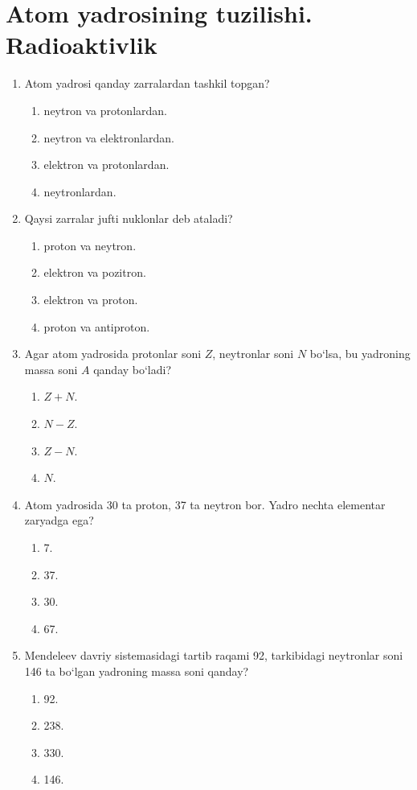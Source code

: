 \section{Atom yadrosining tuzilishi. Radioaktivlik}


\begin{enumerate}

\item Atom yadrosi qanday zarralardan tashkil topgan?
\begin{enumerate}[label=\Alph*)]
\item neytron va protonlardan.
\item neytron va elektronlardan.
\item elektron va protonlardan.
\item neytronlardan.
\end{enumerate}

\item Qaysi zarralar jufti nuklonlar deb ataladi?
\begin{enumerate}[label=\Alph*)]
\item proton va neytron.
\item elektron va pozitron.
\item elektron va proton.
\item proton va antiproton.
\end{enumerate}

\item Agar atom yadrosida protonlar soni $Z$, neytronlar soni $N$ bo‘lsa, bu yadroning massa soni $A$ qanday bo‘ladi?
\begin{enumerate}[label=\Alph*)]
\item $Z+N$.
\item $N-Z$.
\item $Z-N$.
\item $N$.
\end{enumerate}

\item Atom yadrosida 30 ta proton, 37 ta neytron bor. Yadro nechta elementar zaryadga ega?
\begin{enumerate}[label=\Alph*)]
\item 7.
\item 37.
\item 30.
\item 67.
\end{enumerate}

\item Mendeleev davriy sistemasidagi tartib raqami 92, tarkibidagi neytronlar soni 146 ta bo‘lgan yadroning massa soni qanday?
\begin{enumerate}[label=\Alph*)]
\item 92.
\item 238.
\item 330.
\item 146.
\end{enumerate}


\end{enumerate}
